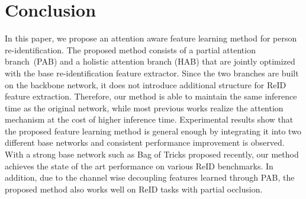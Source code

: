 \documentclass[10pt,twocolumn,letterpaper]{article}
\begin{document}
\section{Conclusion}
In this paper, we propose an attention aware feature learning method for person re-identification. The proposed method consists of a partial attention branch~(PAB) and a holistic attention branch (HAB) that are jointly optimized with the base re-identification feature extractor. Since the two branches are built on the backbone network, it does not introduce additional structure for ReID feature extraction. Therefore, our method is able to maintain the same inference time as the original network, while most previous works realize the attention mechanism at the cost of higher inference time. Experimental results show that the proposed feature learning method is general enough by integrating it into two different base networks and consistent performance improvement is observed. With a strong base network such as Bag of Tricks proposed recently, our method achieves the state of the art performance on various ReID benchmarks. In addition, due to the channel wise decoupling features learned through PAB, the proposed method also works well on ReID tasks with partial occlusion.





{\small


}
\end{document}
